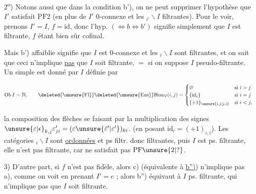 
2\textsuperscript{o}) Notons aussi que dans la condition b'), on ne peut supprimer l'hypothèse que $I'$ satisfait $\mathrm{PF}2$ (en plus de $I'$ $0$-connexe et les $ {}_{i'}\backslash I$ filtrantes). Pour le voir, prenons  $I'=I$, $f=\mathrm{id}$, donc l'hyp.  $(\Leftrightarrow b\Leftrightarrow b')$ signifie simplement que $I$ est filtrante, $f$ étant bien sûr cofinal.

Mais b') affaiblie signifie que $I$ est $0$-connexe et les $ {}_{i}\backslash I$ sont filtrantes, et on sait que ceci n'implique \uline{pas} que $I$ soit filtrante, $=$ si on suppose $I$ pseudo-filtrante. Un  simple est donné par $I$ définie par

\[
\mathrm{Ob}\,I=\mathbb{N},\qquad
\deleted{\unsure{\mathrm{Fl}}}\deleted{\unsure{\mathrm{Ens}}}
\mathrm{Hom}_{I}(i,j)=
\begin{cases}
\varnothing&\text{si }i>j\\
\{\mathrm{id}_i\}&\text{si }i=j\\
\{\pm1\}_{\unsure{i,j|j,i}}&\text{si }i<j,
\end{cases}
\]

la composition des flèches se faisant par la multiplication des signes $\unsure{\varepsilon|\epsilon}_{k,j}\varepsilon'_{ji}=(\varepsilon\unsure{\bar{\varepsilon}'|\varepsilon'})_{ki}$. (en posant $\mathrm{id}_i=(+1)_{i,i}$). Les catégories $ {}_i\backslash I$ sont  \uline{ordonnées} et ps filtr. donc filtrantes,  puis $I$ est ps. filtrante,  elle n'est pas filtrante, car ne satisfait pas $\mathrm{PF}\unsure{2|?}$.

3) D'autre part, si $f$ n'est pas fidèle, alors c) (équivalente à \uline{b'')}) n'implique pas a), comme on voit en prenant $I'=e$ ; alors b'') équivaut à $I$ ps. filtrante, qui n'implique pas que $I$ soit filtrante.

